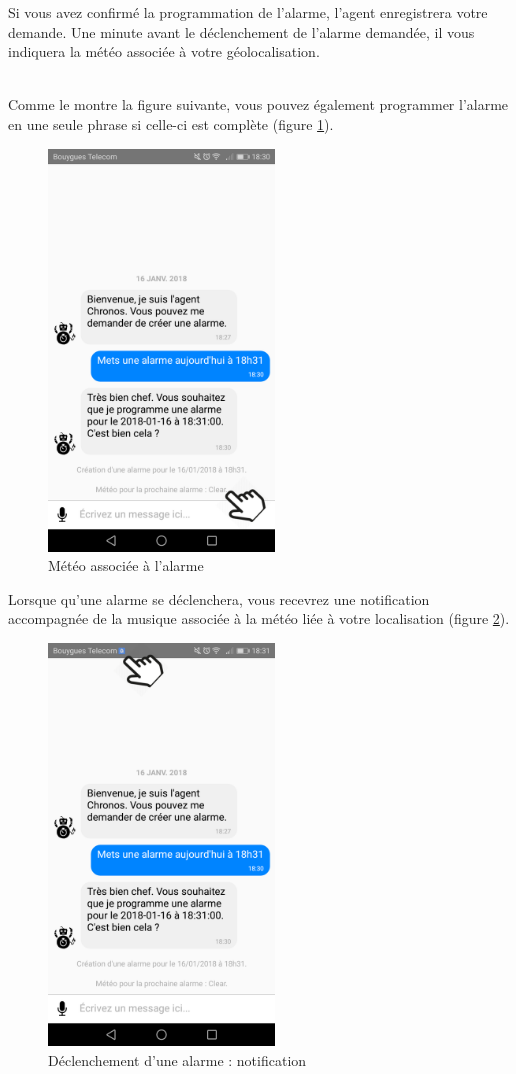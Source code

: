 Si vous avez confirmé la programmation de l'alarme, l'agent enregistrera votre demande. Une minute avant le déclenchement de l'alarme demandée, il vous indiquera la météo associée à votre géolocalisation. 

~\\\indent
Comme le montre la figure suivante, vous pouvez également programmer l'alarme en une seule phrase si celle-ci est complète (figure \ref{G}).

\begin{figure}[H]
  \centering
  \includegraphics[width=6cm]{images/G.png}
  \caption{Météo associée à l'alarme}
  \label{G}
\end{figure}

Lorsque qu'une alarme se déclenchera, vous recevrez une notification accompagnée de la musique associée à la météo liée à votre localisation (figure \ref{H}).

\begin{figure}[H]
  \centering
  \includegraphics[width=6cm]{images/H.png}
  \caption{Déclenchement d'une alarme : notification}
  \label{H}
\end{figure}

